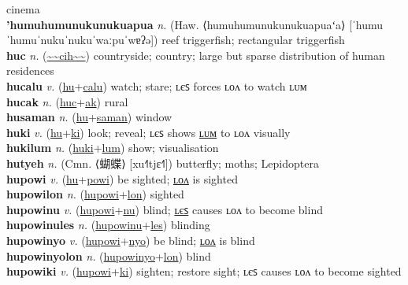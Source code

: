 cinema \label{humocakilyot} \\
\textbf{'humuhumunukunukuapua} \textit{n.} (Haw. ⟨humuhumunukunukuapuaʻa⟩ [ˈhumuˈhumuˈnukuˈnukuˈwaːpuˈwɐʔə])
reef triggerfish; rectangular triggerfish \label{'humuhumunukunukuapua} \\
\textbf{huc} \textit{n.} (\hyperref[cih]{\~{}\~{}cih\~{}\~{}})
countryside; country; large but sparse distribution of human residences \label{huc} \\
\textbf{hucalu} \textit{v.} (\hyperref[hu]{hu}+\hyperref[calu]{calu})
watch; stare; ʟєꜱ forces ʟᴏᴧ to watch ʟᴜᴍ \label{hucalu} \\
\textbf{hucak} \textit{n.} (\hyperref[huc]{huc}+\hyperref[ak]{ak})
rural \label{hucak} \\
\textbf{husaman} \textit{n.} (\hyperref[hu]{hu}+\hyperref[saman]{saman})
window \label{husaman} \\
\textbf{huki} \textit{v.} (\hyperref[hu]{hu}+\hyperref[ki]{ki})
look; reveal; ʟєꜱ shows \hyperref[hukilum]{ʟᴜᴍ} to ʟᴏᴧ visually \label{huki} \\
\textbf{hukilum} \textit{n.} (\hyperref[huki]{huki}+\hyperref[lum]{lum})
show; visualisation \label{hukilum} \\
\textbf{hutyeh} \textit{n.} (Cmn. ⟨蝴蝶⟩ [xu˧˥tjɛ˧˥])
butterfly; moths; Lepidoptera \label{hutyeh} \\
\textbf{hupowi} \textit{v.} (\hyperref[hu]{hu}+\hyperref[powi]{powi})
be sighted; \hyperref[hupowilon]{ʟᴏᴧ} is sighted \label{hupowi} \\
\textbf{hupowilon} \textit{n.} (\hyperref[hupowi]{hupowi}+\hyperref[lon]{lon})
sighted \label{hupowilon} \\
\textbf{hupowinu} \textit{v.} (\hyperref[hupowi]{hupowi}+\hyperref[nu]{nu})
blind; \hyperref[hupowinules]{ʟєꜱ} causes ʟᴏᴧ to become blind \label{hupowinu} \\
\textbf{hupowinules} \textit{n.} (\hyperref[hupowinu]{hupowinu}+\hyperref[les]{les})
blinding \label{hupowinules} \\
\textbf{hupowinyo} \textit{v.} (\hyperref[hupowi]{hupowi}+\hyperref[nyo]{nyo})
be blind; \hyperref[hupowinyolon]{ʟᴏᴧ} is blind \label{hupowinyo} \\
\textbf{hupowinyolon} \textit{n.} (\hyperref[hupowinyo]{hupowinyo}+\hyperref[lon]{lon})
blind \label{hupowinyolon} \\
\textbf{hupowiki} \textit{v.} (\hyperref[hupowi]{hupowi}+\hyperref[ki]{ki})
sighten; restore sight; ʟєꜱ causes ʟᴏᴧ to become sighted \label{hupowiki} \\
